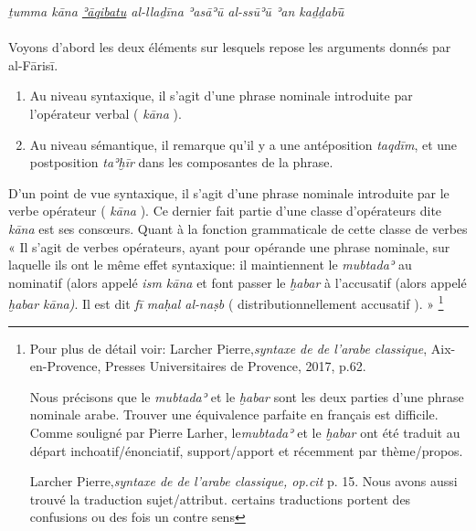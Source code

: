 \documentclass[a4paper,12pt]{report}
\begin{document}
\begin{itemize}
\begin{enumerate}
\begin{Arabic}
 \end{Arabic}
 
 \begin{center}
     

\textit{
ṯumma kāna \underline {ʾāqibatu} al-llaḏīna ʾasāʾū al-ss\=uʾū  ʾan kaḏḏabū}̄

  \end{center}
  
\paragraph{}
Voyons d'abord   les deux éléments sur lesquels repose les arguments donnés par al-F\=aris\=i.
 \begin{enumerate}
     \item  Au niveau  syntaxique, il s'agit d'une phrase nominale introduite par  l'opérateur verbal ( \textit{kāna} ).  

     \item  Au niveau sémantique, il remarque qu'il y a une antéposition \textit{taqd\=im},  et une postposition \textit{taʾḫīr} dans les composantes de la phrase. 
 \end{enumerate} 


D'un point de vue syntaxique, il s'agit d'une phrase nominale introduite par  le verbe opérateur ( \textit{kāna} ). Ce dernier fait partie d'une classe d'opérateurs dite  \textit{kāna}  est ses consœurs. Quant à la fonction grammaticale de cette classe de verbes   « Il s'agit de verbes opérateurs, ayant pour opérande une phrase nominale, sur laquelle ils ont le même effet syntaxique: il maintiennent le \textit{mubtadaʾ}  au nominatif (alors appelé \textit{ism kāna} et font passer le \textit{ḫabar} à l'accusatif (alors appelé \textit{ḫabar kāna)}. Il est dit \textit{fī maḥal al-naṣb} ( distributionnellement accusatif ). » \footnote{ Pour plus de détail voir: Larcher Pierre,\textit{syntaxe de de l'arabe classique}, Aix-en-Provence, Presses Universitaires de Provence, 2017, p.62.

Nous précisons que  le \textit{mubtadaʾ} et le \textit{ḫabar} sont les deux parties d'une phrase nominale arabe.   Trouver une équivalence parfaite   en français est difficile. Comme souligné par Pierre Larher, le\textit{mubtadaʾ} et le \textit{ḫabar} ont été traduit au départ inchoatif/énonciatif, support/apport et récemment par thème/propos. 

Larcher Pierre,\textit{syntaxe de de l'arabe classique, op.cit} p. 15. Nous avons aussi trouvé la traduction sujet/attribut. certains traductions portent des confusions ou des fois un contre sens

}
\end{enumerate}
\end{itemize}
\end{document}
